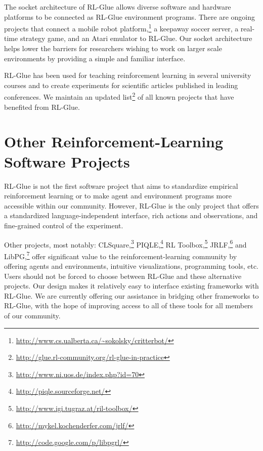 \documentclass[twoside,11pt]{article}
\begin{document}
The socket architecture of RL-Glue allows diverse software and hardware platforms to be connected as RL-Glue environment programs.  There are ongoing projects that connect a mobile robot platform,\footnote{\url{http://www.cs.ualberta.ca/~sokolsky/critterbot/}} a  keepaway soccer server, a real-time strategy game, and an Atari emulator to RL-Glue. Our socket architecture helps lower the barriers for researchers wishing to work on larger scale environments by providing a simple and familiar interface. %

RL-Glue has been used for teaching reinforcement learning in several university courses and to create experiments for scientific articles published in leading conferences. We maintain an updated list\footnote{\url{http://glue.rl-community.org/rl-glue-in-practice}} of all known projects that have benefited from RL-Glue.



\section{Other Reinforcement-Learning Software Projects}
RL-Glue is not the first software project that aims to  standardize empirical reinforcement learning or to make agent and environment programs more accessible within our community.  However, RL-Glue is the only project that offers a standardized language-independent interface, rich actions and observations, and fine-grained control of the experiment.

Other projects, most notably: CLSquare,\footnote{\url{http://www.ni.uos.de/index.php?id=70}}  PIQLE,\footnote{\url{http://piqle.sourceforge.net/}} RL Toolbox,\footnote{\url{http://www.igi.tugraz.at/ril-toolbox/}
} JRLF,\footnote{\url{http://mykel.kochenderfer.com/jrlf/}}  and LibPG,\footnote{\url{http://code.google.com/p/libpgrl/}} offer significant value to the reinforcement-learning community by offering agents and environments, intuitive visualizations, programming tools, etc.  Users should not be forced to choose between RL-Glue and these alternative projects. Our design makes it relatively easy to interface existing frameworks with RL-Glue.  We are currently offering our assistance in bridging other frameworks to RL-Glue, with the hope of improving access to all of these tools for all members of our community.





 
 
\end{document}
